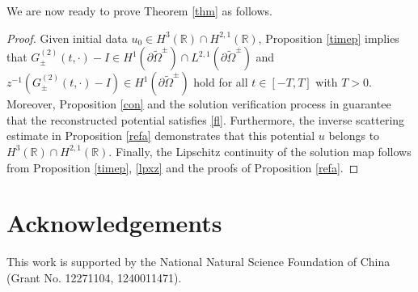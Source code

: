 \documentclass[preprint,compress,12pt]{elsarticle}
\numberwithin{equation}{section}
\begin{document}
We are now ready to prove  Theorem \ref{thm} as follows.


\begin{proof}
Given initial data $u_{0}\in H^{3}(\mathbb{R})\cap H^{2,1}(\mathbb{R})$, Proposition \ref{timep} implies that $G^{(2)}_{\pm}(t,\cdot)-I \in H^{1}(\partial\widetilde{\Omega}^{\pm})\cap L^{2,1}(\partial\widetilde{\Omega}^{\pm})$ and $z^{-1}(G^{(2)}_{\pm}(t,\cdot)-I ) \in H^{1}(\partial\widetilde{\Omega}^{\pm})$ hold for all $t\in [-T,T]$ with $T>0$. Moreover, Proposition \ref{con} and the solution verification process in \cite{Chengglo} guarantee that the reconstructed potential satisfies \eqref{fl}. Furthermore, the inverse scattering estimate in Proposition \ref{refa} demonstrates that this potential $u$ belongs to $H^{3}(\mathbb{R})\cap H^{2,1}(\mathbb{R})$. Finally, the Lipschitz continuity of the solution map follows from Proposition \ref{timep}, \eqref{lpxz} and the proofs of Proposition \ref{refa}.
\end{proof}





\section*{Acknowledgements}
This work is supported by the National Natural Science Foundation of China   {(Grant No. 12271104, 1240011471)}.
\end{document}
